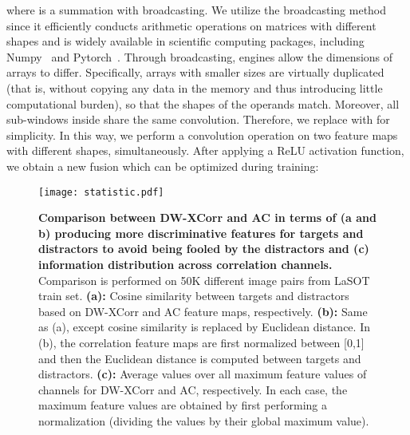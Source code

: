 \documentclass[10pt,twocolumn,letterpaper,final]{cvpr}
\begin{document}
where  is a summation with broadcasting. We utilize the broadcasting method since it efficiently conducts arithmetic operations on matrices with different shapes and is widely available in scientific computing packages, including Numpy~\cite{numpy} and Pytorch~\cite{steiner2019pytorch}. 
{Through broadcasting, engines allow the dimensions of arrays to differ. Specifically, arrays with smaller sizes are virtually duplicated (that is, without copying any data in the memory and thus introducing little computational burden), so that the shapes of the operands match\cite{numpy}}.
Moreover, all sub-windows inside  share the same convolution. Therefore, we replace  with  for simplicity. In this way, we perform a convolution operation on two feature maps with different shapes, simultaneously. 
After applying a ReLU activation function, we obtain a new fusion   which can be optimized during training:







\begin{figure}
  \centering
  \texttt{[image: statistic.pdf]}
  \caption{\textbf{Comparison between DW-XCorr and AC in terms of (a and b) producing more discriminative features for targets and distractors to avoid being fooled by the distractors and (c) 
  information distribution across correlation channels.} Comparison is performed on 50K different image pairs from LaSOT train set. \textbf{(a):} Cosine similarity between targets and distractors based on DW-XCorr and AC feature
maps, respectively. \textbf{(b):} Same as (a), except cosine similarity is replaced by Euclidean distance. In (b), the correlation feature maps are first normalized between [0,1] and then the Euclidean distance is computed between targets and distractors. \textbf{(c):} Average values over all maximum feature values of channels for DW-XCorr and AC, respectively. In each case, the maximum feature values are obtained by first performing a normalization (dividing the values by their global maximum value).
}\label{Fig:2}
\end{figure}
\end{document}
